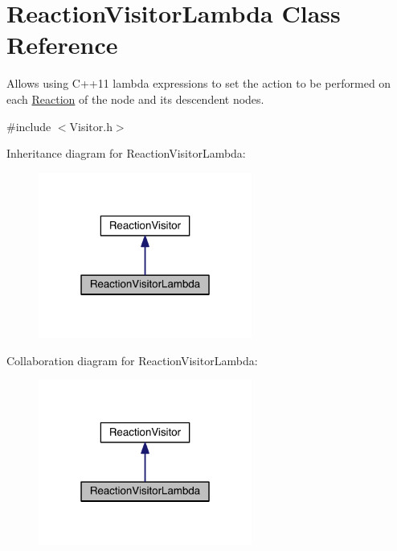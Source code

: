 \hypertarget{classReactionVisitorLambda}{\section{Reaction\+Visitor\+Lambda Class Reference}
\label{classReactionVisitorLambda}
}


Allows using C++11 lambda expressions to set the action to be performed on each \hyperlink{classReaction}{Reaction} of the node and its descendent nodes.  




{\ttfamily \#include $<$Visitor.\+h$>$}



Inheritance diagram for Reaction\+Visitor\+Lambda\+:\nopagebreak
\begin{figure}[H]
\begin{center}
\leavevmode
\includegraphics[width=199pt]{classReactionVisitorLambda__inherit__graph}
\end{center}
\end{figure}


Collaboration diagram for Reaction\+Visitor\+Lambda\+:\nopagebreak
\begin{figure}[H]
\begin{center}
\leavevmode
\includegraphics[width=199pt]{classReactionVisitorLambda__coll__graph}
\end{center}
\end{figure}
